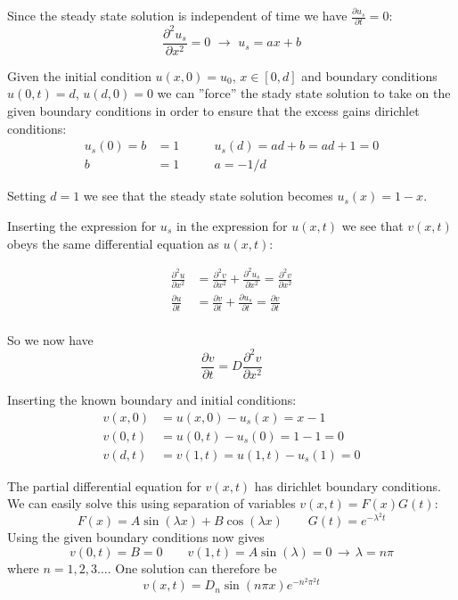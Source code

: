\documentclass[a4paper,11pt]{report}
\newcommand{\pdt}[1]{\frac{\partial #1}{\partial t}}
\newcommand{\pddx}[1]{\frac{\partial^2 #1}{\partial x^2}}
\begin{document}
Since the steady state solution is independent of time we have \(\pdt{u_s} = 0 \):
\[
\pddx{u_s} = 0 \, \,  \longrightarrow \, \, u_s = ax + b
\]

Given the initial condition $u(x, 0) = u_0, \, x \in [0, d]$ and boundary conditions $u(0, t) = d $, $u(d, 0) = 0$ we can ''force'' the stady state solution to take on the given boundary conditions in order to ensure that the excess gains dirichlet conditions: 
\begin{align*}                                                                                                                                                                                                                                                                              
u_s(0) = b &= 1 \qquad &u_s(d) = ad + b = ad + 1 = 0 \\
b &= 1 \qquad &a = -1/d
\end{align*}

Setting $ d= 1$ we see that the steady state solution becomes $u_s(x) = 1 - x$. 

Inserting the expression for $u_s$ in the expression for $u(x, t)$ we see that $v(x, t)$ obeys the same differential equation as $u(x, t)$: 

\begin{align*}
\pddx{u} &= \pddx{v} + \pddx{u_s} = \pddx{v} \\
\pdt{u} &=  \pdt{v} + \pdt{u_s} = \pdt{v}\\
\end{align*}

So we now have
\begin{equation}\label{eq:excess}
\pdt{v} = D\pddx{v}
\end{equation}

Inserting the known boundary and initial conditions: 
\begin{align*}
v(x, 0) &= u(x, 0) - u_s(x) = x - 1 \\
v(0, t) &= u(0, t) - u_s(0) = 1 - 1 = 0 \\
v(d, t) &= v(1, t) = u(1, t) - u_s(1) = 0 
\end{align*}

The partial differential equation for $v(x, t)$ has dirichlet boundary conditions. We can easily solve this using separation of variables $v(x, t) = F(x) G(t)$:
\[
 F(x) = A\sin(\lambda x ) + B\cos(\lambda x) \qquad G(t) = e^{-\lambda^2 t}
\]
Using the given boundary conditions now gives 
\[
 v(0, t) = B = 0 \qquad v(1,t) = A\sin(\lambda) = 0 \, \rightarrow \, \lambda = n\pi
\]
where $n = 1, 2, 3 \ldots$. One solution can therefore be 
\[
 v(x, t) = D_n \sin(n \pi x)e^{-n^2 \pi^2 t}
\]
\end{document}
